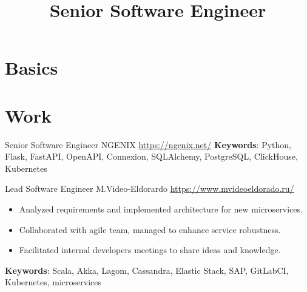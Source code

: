 \documentclass[a4paper, serif, 12pt]{moderncv}
\title{Senior Software Engineer}
\begin{document}
\maketitle

\section{Basics}


\section{Work}

        {Senior Software Engineer}
        {NGENIX}
        {\url{https://ngenix.net/}}
        {}
        {\textbf{Keywords}: Python, Flask, FastAPI, OpenAPI, Connexion, SQLAlchemy, PostgreSQL, ClickHouse, Kubernetes}

        {Lead Software Engineer}
        {M.Video-Eldorardo}
        {\url{https://www.mvideoeldorado.ru/}}
        {}
        {\begin{itemize}
\item Analyzed requirements and implemented architecture for new microservices.
\item Collaborated with agile team, managed to enhance service robustness.
\item Facilitated internal developers meetings to share ideas and knowledge.
\end{itemize}
\textbf{Keywords}: Scala, Akka, Lagom, Cassandra, Elastic Stack, SAP, GitLabCI, Kubernetes, microservices}
\end{document}
